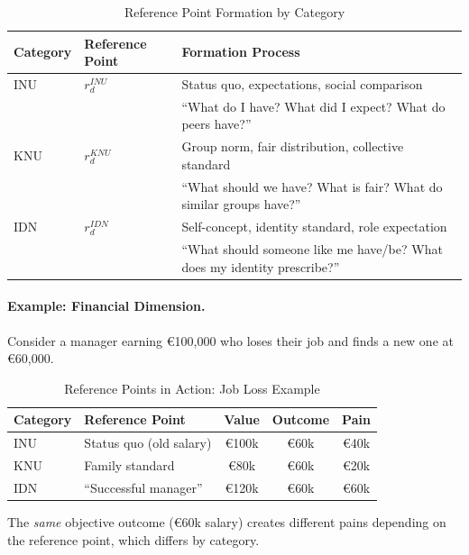 \begin{table}[htbp]
\centering
\caption{Reference Point Formation by Category}
\label{tab:reference-points}
\renewcommand{\arraystretch}{1.4}
\begin{tabular}{@{}llp{6cm}@{}}
\toprule
\textbf{Category} & \textbf{Reference Point} & \textbf{Formation Process} \\
\midrule
INU & $r^{INU}_d$ & Status quo, expectations, social comparison \\
& & ``What do I have? What did I expect? What do peers have?'' \\
\addlinespace
KNU & $r^{KNU}_d$ & Group norm, fair distribution, collective standard \\
& & ``What should we have? What is fair? What do similar groups have?'' \\
\addlinespace
IDN & $r^{IDN}_d$ & Self-concept, identity standard, role expectation \\
& & ``What should someone like me have/be? What does my identity prescribe?'' \\
\bottomrule
\end{tabular}
\end{table}

\paragraph{Example: Financial Dimension.}
Consider a manager earning \euro{100,000} who loses their job and finds 
a new one at \euro{60,000}.

\begin{table}[htbp]
\centering
\caption{Reference Points in Action: Job Loss Example}
\label{tab:reference-example}
\renewcommand{\arraystretch}{1.3}
\begin{tabular}{@{}llccc@{}}
\toprule
\textbf{Category} & \textbf{Reference Point} & \textbf{Value} & \textbf{Outcome} & \textbf{Pain} \\
\midrule
INU & Status quo (old salary) & \euro{100k} & \euro{60k} & \euro{40k} \\
KNU & Family standard & \euro{80k} & \euro{60k} & \euro{20k} \\
IDN & ``Successful manager'' & \euro{120k} & \euro{60k} & \euro{60k} \\
\bottomrule
\end{tabular}
\end{table}

The \emph{same} objective outcome (\euro{60k} salary) creates different 
pains depending on the reference point, which differs by category.

